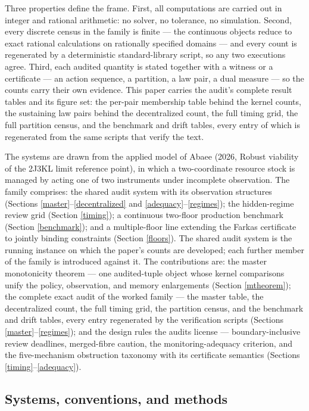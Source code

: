 \documentclass[10pt,twocolumn]{article}
\theoremstyle{definition}
\begin{document}
Three properties define the frame. First, all computations are carried
out in integer and rational arithmetic: no solver, no tolerance, no
simulation. Second, every discrete census in the family is finite --- the continuous objects reduce to exact rational calculations on rationally specified domains --- and every count is regenerated by a deterministic standard-library script, so any two executions agree. Third, each audited quantity is stated together with a
witness or a certificate --- an action sequence, a partition, a law
pair, a dual measure --- so the counts carry their own evidence. This paper carries the audit's complete result tables and its figure set:
the per-pair membership table behind the kernel counts, the sustaining
law pairs behind the decentralized count, the full timing grid, the full
partition census, and the benchmark and drift tables, every entry of
which is regenerated from the same scripts that verify the text.

The systems are drawn from the applied model of Abaee (2026, Robust viability of the 2J3KL limit reference point), in which
a two-coordinate resource stock is managed by acting one of two
instruments under incomplete observation. The family comprises: the
shared audit system with its observation structures (Sections
\ref{master}--\ref{decentralized} and \ref{adequacy}--\ref{regimes});
the hidden-regime review grid (Section
\ref{timing}); a continuous two-floor production benchmark (Section
\ref{benchmark}); and a multiple-floor line extending the Farkas
certificate to jointly binding constraints (Section \ref{floors}). The
shared audit system is the running instance on which the paper's counts
are developed; each further member of the family is introduced against
it. The contributions are: the master monotonicity theorem --- one
audited-tuple object whose kernel comparisons unify the policy,
observation, and memory enlargements (Section \ref{mtheorem}); the
complete exact audit of the worked family --- the master table, the
decentralized count, the full timing grid, the partition census, and the
benchmark and drift tables, every entry regenerated by the verification
scripts (Sections \ref{master}--\ref{regimes}); and the design rules
the audits license --- boundary-inclusive review deadlines,
merged-fibre caution, the monitoring-adequacy criterion, and the
five-mechanism obstruction taxonomy with its certificate semantics
(Sections \ref{timing}--\ref{adequacy}).

\subsection{Systems, conventions, and methods}\label{frame}
\end{document}
